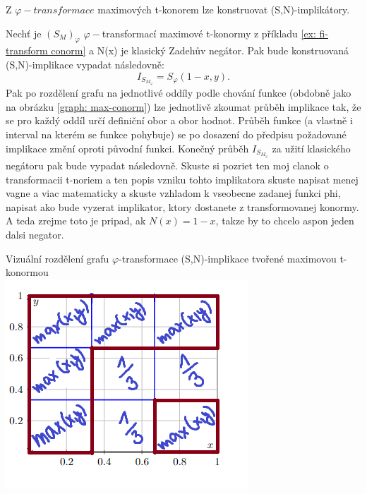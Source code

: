 Z $\varphi-transformace$ maximových t-konorem lze konstruovat (S,N)-implikátory.
\begin{example}
    Nech\v t je $(S_M)_\varphi $ $ \varphi-$transformací maximové t-konormy z příkladu \ref{ex: fi-transform conorm} a N(x) je klasický Zadeh\r uv negátor. Pak bude konstruovaná (S,N)-implikace vypadat následovně: $$I_{S_{M_\varphi}} = S_\varphi(1-x, y).$$
    Pak po rozdělení grafu na jednotlivé oddíly podle chování funkce (obdobně jako na obrázku \ref{graph: max-conorm}) lze jednotlivě zkoumat pr\r uběh implikace tak, že se pro každý oddíl určí definiční obor a obor hodnot. Pr\r uběh funkce (a vlastně i interval na kterém se funkce pohybuje) se po dosazení do předpisu požadované implikace změní oproti p\r uvodní funkci. Konečný pr\r uběh $I_{S_{M_\varphi}}$ za užití klasického negátoru pak bude vypadat následovně.
    {\color{red} Skuste si pozriet ten moj clanok o transformacii t-noriem a ten popis vzniku tohto implikatora skuste napisat menej vagne a viac matematicky a skuste vzhladom k vseobecne zadanej funkci phi, napisat ako bude vyzerat implikator, ktory dostanete z transformovanej konormy. A teda zrejme toto je pripad, ak $N(x)=1-x$, takze by to chcelo aspon jeden dalsi negator.}
    \begin{graph} Vizu\' aln\' i rozd\v elen\'i grafu $\varphi$-transformace (S,N)-implikace tvořené maximovou t-konormou\\
        \centering
        \includegraphics[scale=0.8]{template-fig/phi-impli.png}
    \end{graph}

\end{example}

